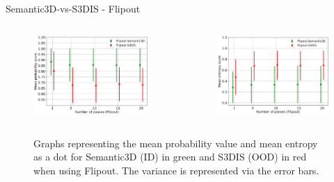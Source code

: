 \documentclass[aspectratio=169]{beamer}
\begin{document}
\begin{frame}{Semantic3D-vs-S3DIS - Flipout}
    \begin{columns}
        \begin{column}{0.5\textwidth}
            \begin{figure}
                \centering
                \includegraphics[scale=0.28]{images/ood1/MSP_Mean_OOD1_Fout.jpg}
            \end{figure}
        \end{column}
        \begin{column}{0.5\textwidth}
            \begin{figure}
                \centering
                \includegraphics[scale=0.28]{images/ood1/Ent_Mean_OOD1_Fout.jpg}
            \end{figure}
        \end{column}
    \end{columns}
    \begin{figure}
        \caption{Graphs representing the mean probability value and mean entropy as a dot for Semantic3D (ID) in green and
        S3DIS (OOD) in red when using Flipout. The variance is represented via the error bars.}
    \end{figure}
\end{frame}
\end{document}
